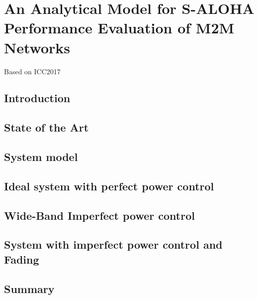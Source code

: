 \chapter{An Analytical Model for S-ALOHA Performance Evaluation of M2M Networks}

\ifpdf
    \graphicspath{{Chapter3/Figs/Raster/}{Chapter3/Figs/PDF/}{Chapter3/Figs/}}
\else
    \graphicspath{{Chapter3/Figs/Vector/}{Chapter3/Figs/}}
\fi
Based on ICC2017
\section{Introduction}

\section{State of the Art}

\section{System model}


\section{Ideal system with perfect power control}


\section{Wide-Band Imperfect power control}


\section{System with imperfect power control and Fading}

\section{Summary}




